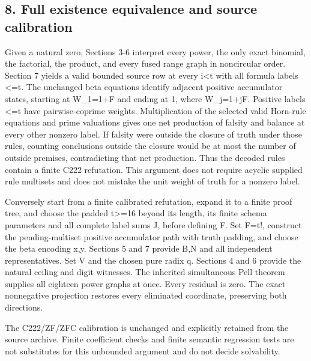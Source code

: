 \subsection*{8. Full existence equivalence and source calibration}



Given a natural zero, Sections 3-6 interpret every power, the only exact binomial, the factorial, the product, and every fused range graph in noncircular order. Section 7 yields a valid bounded source row at every i\textless{}\allowbreak{}t with all formula labels \textless{}\allowbreak{}=\allowbreak{}t. The unchanged beta equations identify adjacent positive accumulator states, starting at W\_\allowbreak{}1=\allowbreak{}1+\allowbreak{}F and ending at 1, where W\_\allowbreak{}j=\allowbreak{}1+\allowbreak{}jF. Positive labels \textless{}\allowbreak{}=\allowbreak{}t have pairwise-coprime weights. Multiplication of the selected valid Horn-rule equations and prime valuations gives one net production of falsity and balance at every other nonzero label. If falsity were outside the closure of truth under those rules, counting conclusions outside the closure would be at most the number of outside premises, contradicting that net production. Thus the decoded rules contain a finite C222 refutation. This argument does not require acyclic supplied rule multisets and does not mistake the unit weight of truth for a nonzero label.



Conversely start from a finite calibrated refutation, expand it to a finite proof tree, and choose the padded t\textgreater{}\allowbreak{}=\allowbreak{}16 beyond its length, its finite schema parameters and all complete label sums J, before defining F. Set F=\allowbreak{}t!, construct the pending-multiset positive accumulator path with truth padding, and choose the beta encoding x,y. Sections 5 and 7 provide B,N and all independent representatives. Set V and the chosen pure radix q. Sections 4 and 6 provide the natural ceiling and digit witnesses. The inherited simultaneous Pell theorem supplies all eighteen power graphs at once. Every residual is zero. The exact nonnegative projection restores every eliminated coordinate, preserving both directions.



The C222/\allowbreak{}ZF/\allowbreak{}ZFC calibration is unchanged and explicitly retained from the source archive. Finite coefficient checks and finite semantic regression tests are not substitutes for this unbounded argument and do not decide solvability.



